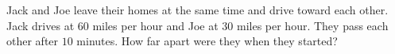 Jack and Joe leave their homes at the same time and drive toward each other. Jack drives at $60$ miles per hour and Joe at $30$ miles per hour. They pass each other after $10$ minutes. How far apart were they when they started?
